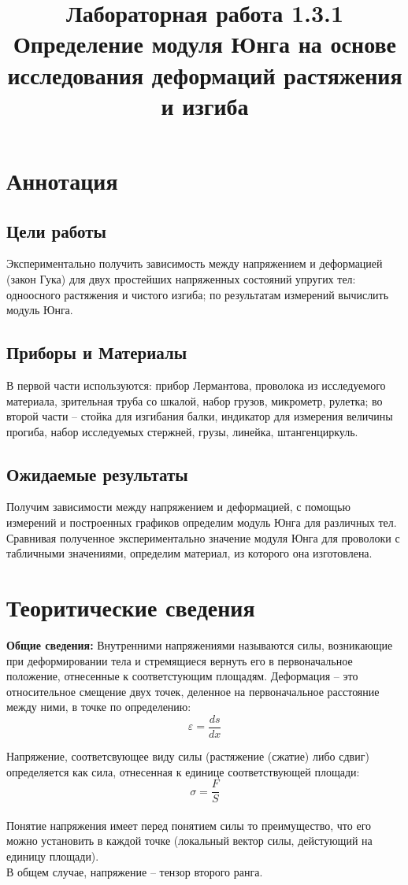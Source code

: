\documentclass[a4paper,12pt]{article}
\title{Лабораторная работа 1.3.1\\Определение модуля Юнга на основе исследования деформаций растяжения и изгиба}
\date{}
\begin{document}
\maketitle

\section{Аннотация}
\subsection{Цели работы}
Экспериментально получить зависимость между напряжением и деформацией (закон Гука) для двух простейших напряженных состояний упругих тел: одноосного растяжения и чистого изгиба; по результатам измерений вычислить модуль Юнга.
\subsection{Приборы и Материалы}
В первой части используются: прибор Лермантова, проволока из исследуемого материала, зрительная труба со шкалой,
набор грузов, микрометр, рулетка; во второй части -- стойка для изгибания балки, индикатор для измерения величины прогиба, набор исследуемых стержней, грузы, линейка, штангенциркуль.
\subsection{Ожидаемые результаты}
Получим зависимости между напряжением и деформацией, с помощью измерений и построенных графиков определим модуль Юнга для различных тел. Сравнивая полученное экспериментально значение модуля Юнга для проволоки с табличными значениями, определим материал, из которого она изготовлена.

\section{Теоритические сведения}
\textbf{Общие сведения:}
Внутренними напряжениями называются силы, возникающие при деформировании тела и стремящиеся вернуть его в первоначальное положение, отнесенные к соответстующим площадям.
Деформация -- это относительное смещение двух точек, деленное на первоначальное расстояние между ними, в точке по определению: \[\varepsilon = \frac{ds}{dx}\]

Напряжение, соответсвующее виду силы (растяжение (сжатие) либо сдвиг) определяется как сила, отнесенная к единице соответствующей площади: \[\sigma = \frac{F}{S}\]\\
Понятие напряжения имеет перед понятием силы то преимущество, что его можно установить в каждой точке (локальный вектор силы, дейстующий на единицу площади).\\
В общем случае, напряжение -- тензор второго ранга.
\end{document}
